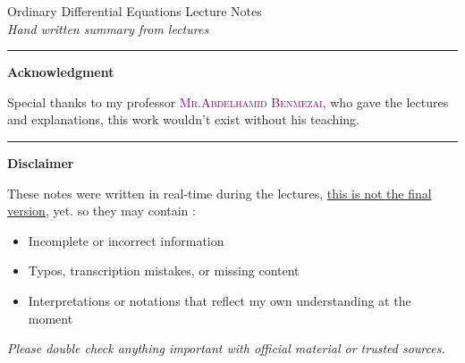 \documentclass{report}
\begin{document}
\begin{titlepage}
  \begin{center}
    \vspace*{2cm}
    {\LARGE Ordinary Differential Equations Lecture Notes}
    \\
    \vspace{1cm}
    {\large \it Hand written summary from lectures}
    \normalfont
  \end{center}
  \rule{\textwidth}{0.4pt}
  \begin{center}
    \textbf{Acknowledgment}
  \end{center}
  \begin{center}
    Special thanks to my professor \textsc{\textcolor{purple}{\large Mr.Abdelhamid Benmezai}}\normalfont,
    who gave the lectures and explanations,
    this work wouldn't exist without his teaching.
  \end{center}
  \begin{center}
  \rule{\textwidth}{0.4pt}
    \textbf{Disclaimer}
  \end{center}
  \begin{center}
    These notes were written in real-time
    during the lectures,
    \underline{this is not the final version}, yet. so they may contain :
    \begin{itemize}
      \item
        Incomplete or incorrect information
      \item
        Typos, transcription mistakes, or missing content
      \item
        Interpretations or notations that reflect my own understanding
        at the moment
    \end{itemize}
  \end{center}
  \vfill
  \begin{center}
    \it
    \large
    Please double check anything important with official
    material or trusted sources. \normalfont
  \end{center}
\end{titlepage}
\end{document}

